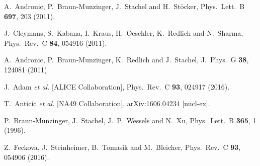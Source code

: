 \documentclass[epj]{svjour}
\begin{document}
\begin{thebibliography}{9}
  A.~Andronic, P.~Braun-Munzinger, J.~Stachel and H.~St\"ocker,
  Phys.\ Lett.\ B {\bf 697}, 203 (2011).

  J.~Cleymans, S.~Kabana, I.~Kraus, H.~Oeschler, K.~Redlich and N.~Sharma,
  Phys.\ Rev.\ C {\bf 84}, 054916 (2011).

  A.~Andronic, P.~Braun-Munzinger, K.~Redlich and J.~Stachel,
  J.\ Phys.\ G {\bf 38}, 124081 (2011).


  J.~Adam {\it et al.} [ALICE Collaboration],
  Phys.\ Rev.\ C {\bf 93}, 024917 (2016).

  T.~Anticic {\it et al.} [NA49 Collaboration],
  arXiv:1606.04234 [nucl-ex].

  P.~Braun-Munzinger, J.~Stachel, J.~P.~Wessels and N.~Xu,
  Phys.\ Lett.\ B {\bf 365}, 1 (1996).

  Z.~Feckova, J.~Steinheimer, B.~Tomasik and M.~Bleicher,
  Phys.\ Rev.\ C {\bf 93}, 054906 (2016).


\end{thebibliography}
\end{document}

